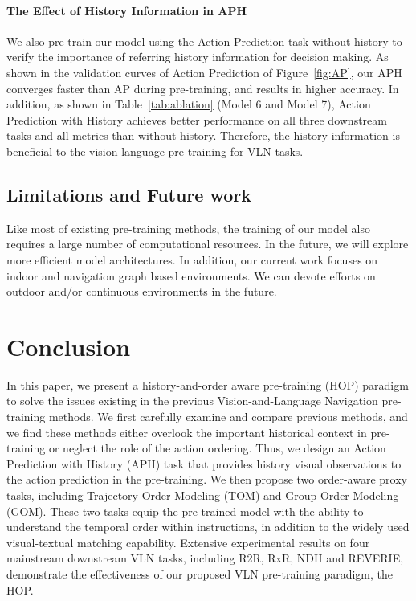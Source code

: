 \documentclass[10pt,twocolumn,letterpaper]{article}
\begin{document}
\vspace{-3pt}
\paragraph{The Effect of History Information in APH}
We also pre-train our model using the Action Prediction task without history to verify the importance of referring history information for decision making. 
As shown in the validation curves of Action Prediction of Figure~\ref{fig:AP}, our APH converges faster than AP during pre-training, and results in higher accuracy. 
In addition, as shown in Table~\ref{tab:ablation} (Model 6 and  Model 7), Action Prediction with History achieves better performance on all three downstream tasks and all metrics than without history. Therefore, the history information is beneficial to the vision-language pre-training for VLN tasks.


\subsection{Limitations and Future work}
Like most of existing pre-training methods, the training of our model also requires a large number of computational resources. In the future, we will explore more efficient model architectures. 
In addition, our current work focuses on indoor and navigation graph based environments. We can devote efforts on outdoor and/or continuous environments in the future.

 \section{Conclusion}
In this paper, we present a history-and-order aware pre-training (HOP) paradigm to solve the issues existing in the previous Vision-and-Language Navigation pre-training methods.
We first carefully examine and compare previous methods, and we find these methods either overlook the important historical context in pre-training or neglect the role of the action ordering. Thus, we design an Action Prediction with History (APH) task that provides history visual observations to the action prediction in the pre-training. We then propose two order-aware proxy tasks, including Trajectory Order Modeling (TOM) and Group Order Modeling (GOM). 
These two tasks equip the pre-trained model with the ability to understand the temporal order within instructions, in addition to the widely used visual-textual matching capability.
Extensive experimental results on four mainstream downstream VLN tasks, including R2R, RxR, NDH and REVERIE, demonstrate the effectiveness of our proposed VLN pre-training paradigm, the HOP. 
\end{document}
